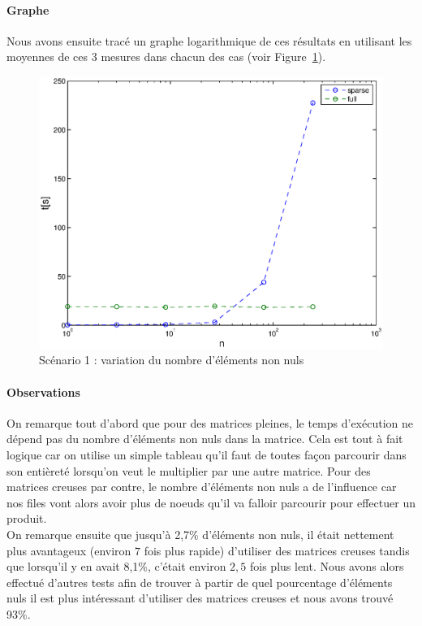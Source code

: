 \documentclass[12pt,a4paper]{article}
\begin{document}
\paragraph{Graphe}
Nous avons ensuite tracé un graphe logarithmique de ces résultats en utilisant les moyennes de ces 3 mesures dans chacun des cas (voir Figure~\ref{vnz}).
\begin{figure}[!h]
	\begin{center}
		\includegraphics[width=15cm]{taillecst.eps}
		\caption{Scénario 1 : variation du nombre d'éléments non nuls}
		\label{vnz}
	\end{center}
\end{figure}

\paragraph{Observations}

On remarque tout d'abord que pour des matrices pleines, le temps d'exécution ne dépend pas du nombre d'éléments non nuls dans la matrice. Cela est tout à fait logique car on utilise un simple tableau qu'il faut de toutes façon parcourir dans son entièreté lorsqu'on veut le multiplier par une autre matrice. Pour des matrices creuses par contre, le nombre d'éléments non nuls a de l'influence car nos files vont alors avoir plus de noeuds qu'il va falloir parcourir pour effectuer un produit.\\

On remarque ensuite que jusqu'à 2,7\% d'éléments non nuls, il était nettement plus avantageux (environ $7$ fois plus rapide) d'utiliser des matrices creuses tandis que lorsqu'il y en avait 8,1\%, c'était environ $2,5$ fois plus lent. Nous avons alors effectué d'autres tests afin de trouver à partir de quel pourcentage d'éléments nuls il est plus intéressant d'utiliser des matrices creuses et nous avons trouvé 93\%.
\end{document}

